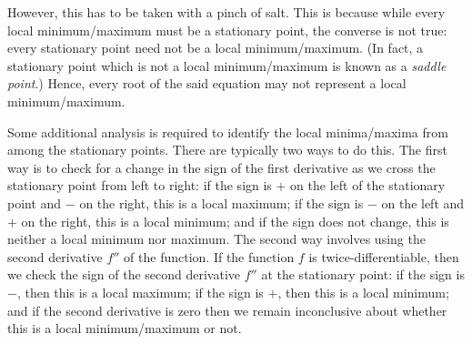 \documentclass[a4paper]{article}
\theoremstyle{definition}
\begin{document}
However, this has to be taken with a pinch of salt.
This is because while every local minimum/maximum must be a stationary point, the converse is not true: every stationary point need not be a local minimum/maximum.
(In fact, a stationary point which is not a local minimum/maximum is known as a \textit{saddle point}.)
Hence, every root of the said equation may not represent a local minimum/maximum.

Some additional analysis is required to identify the local minima/maxima from among the stationary points.
There are typically two ways to do this.
The first way is to check for a change in the sign of the first derivative as we cross the stationary point from left to right: if the sign is $+$ on the left of the stationary point and $-$ on the right, this is a local maximum; if the sign is $-$ on the left and $+$ on the right, this is a local minimum; and if the sign does not change, this is neither a local minimum nor maximum.
The second way involves using the second derivative $f''$ of the function.
If the function $f$ is twice-differentiable, then we check the sign of the second derivative $f''$ at the stationary point: if the sign is $-$, then this is a local maximum; if the sign is $+$, then this is a local minimum; and if the second derivative is zero then we remain inconclusive about whether this is a local minimum/maximum or not.
\end{document}
